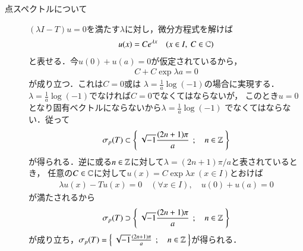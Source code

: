 	\begin{prf}\mbox{}
		\begin{description}
			\item[点スペクトルについて]
				$(\lambda I - T) u = 0$を満たす$\lambda$に対し，微分方程式を解けば
				\begin{align}
					u(x) = Ce^{\lambda x}
					\quad (x \in I,\ C \in \mathbb{C})
				\end{align}
				と表せる．今$u(0) + u(a) = 0$が仮定されているから，
				\begin{align}
					C + C\exp{\lambda a} = 0
				\end{align}
				が成り立つ．これは$C = 0$或は
				$\lambda = \frac{1}{a} \log{(-1)}$の場合に実現する．
				$\lambda = \frac{1}{a} \log{(-1)}$でなければ$C = 0$でなくてはならないが，
				このとき$u = 0$となり固有ベクトルにならないから$\lambda = \frac{1}{a} \log{(-1)}$
				でなくてはならない．従って
				\begin{align}
					\mathfrak{\sigma}_p (T) \subset \left\{\ \sqrt{-1} \frac{(2 n + 1)\pi}{a}\ \, ; \quad n \in \mathbb{Z}\ \right\}
				\end{align}
				が得られる．逆に或る$n \in \mathbb{Z}$に対して$\lambda = (2 n + 1)\pi/a$と表されているとき，
				任意の$C \in \mathbb{C}$に対して$u(x) = C\exp{\lambda x}\ (x \in I)$とおけば
				\begin{align}
					\lambda u(x) - T u(x) = 0 \quad (\forall x \in I),
					\quad u(0) + u(a) = 0
				\end{align}
				が満たされるから
				\begin{align}
					\mathfrak{\sigma}_p (T) \supset \left\{\ \sqrt{-1} \frac{(2 n + 1)\pi}{a}\ \, ; \quad n \in \mathbb{Z}\ \right\}
				\end{align}
				が成り立ち，$\mathfrak{\sigma}_p (T) = \left\{\ \sqrt{-1} \frac{(2 n + 1)\pi}{a}\ \, ; \quad n \in \mathbb{Z}\ \right\}$が得られる．
				

\end{description}
\end{prf}
